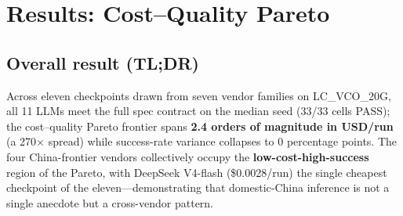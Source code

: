 
\section{Results: Cost--Quality Pareto}
\label{sec:results}

\subsection{Overall result (TL;DR)}
\label{sec:results-tldr}

Across eleven checkpoints drawn from seven vendor families on
LC\_VCO\_20G, all 11 LLMs meet the full spec contract on the
median seed (33/33 cells PASS); the cost--quality Pareto frontier
spans \textbf{2.4 orders of magnitude in USD/run} (a 270$\times$
spread) while success-rate variance collapses to 0 percentage
points. The four China-frontier vendors collectively occupy the
\textbf{low-cost-high-success} region of the Pareto, with DeepSeek
V4-flash (\$0.0028/run) the single cheapest checkpoint of the
eleven---demonstrating that domestic-China inference is not a
single anecdote but a cross-vendor pattern.


